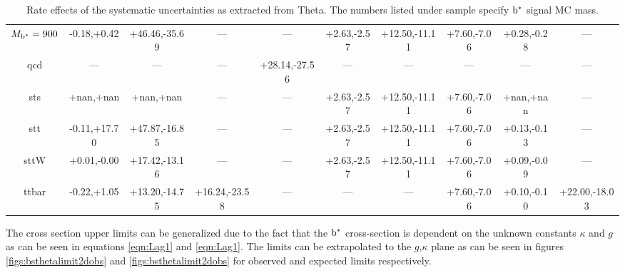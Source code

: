 \begin{table}
\begin{center}
{\begin{tabular}{c||c|c|c|c|c|c|c|c|c}
$M_{\mathrm{b}^{*}}=900$ & -0.18,+0.42 & +46.46,-35.69 & --- & --- & +2.63,-2.57 & +12.50,-11.11 & +7.60,-7.06 & +0.28,-0.28 & ---\\ 
qcd & --- & --- & --- & +28.14,-27.56 & --- & --- & --- & --- & ---\\ 
sts & +nan,+nan & +nan,+nan & --- & --- & +2.63,-2.57 & +12.50,-11.11 & +7.60,-7.06 & +nan,+nan & ---\\ 
stt & -0.11,+17.70 & +47.87,-16.85 & --- & --- & +2.63,-2.57 & +12.50,-11.11 & +7.60,-7.06 & +0.13,-0.13 & ---\\ 
sttW & +0.01,-0.00 & +17.42,-13.16 & --- & --- & +2.63,-2.57 & +12.50,-11.11 & +7.60,-7.06 & +0.09,-0.09 & ---\\ 
ttbar & -0.22,+1.05 & +13.20,-14.75 & +16.24,-23.58 & --- & --- & --- & +7.60,-7.06 & +0.10,-0.10 & +22.00,-18.03\\ 
\hline
\end{tabular}
}
\end{center}
\caption{Rate effects of the systematic uncertainties as extracted from Theta.  The numbers listed under sample specify $\mathrm{b}^{*}$ signal MC mass.}
\label{table:bsnuisance}
\end{table}



The cross section upper limits can be generalized due to the fact that the $\mathrm{b}^{*}$ cross-section is dependent on the unknown constants $\kappa$ and $g$ as can be seen in equations \ref{eqn:Lag1} and \ref{eqn:Lag1}.
The limits can be extrapolated to the $g$,$\kappa$ plane as can be seen in figures \ref{figs:bsthetalimit2dobs} and \ref{figs:bsthetalimit2dobs} for observed and expected limits respectively.




